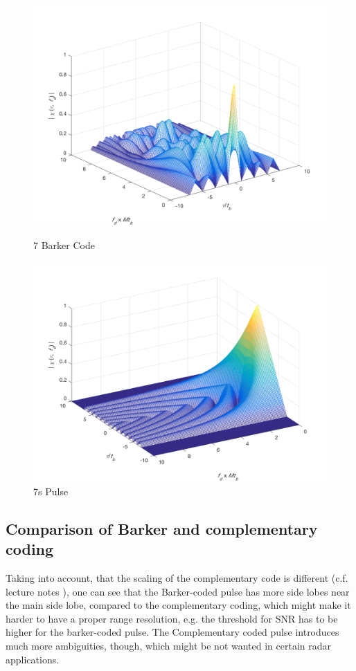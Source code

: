 \begin{figure}[!htbp]
  \centering
  \begin{minipage}[b]{0.45\textwidth}
    \includegraphics[width=\textwidth]{images/barker7_3D}
    \caption{7 Barker Code}
    \label{fig:7barker_3D}
  \end{minipage}
  \hfill
  \begin{minipage}[b]{0.45\textwidth}
    \includegraphics[width=\textwidth]{images/pulse7s_3D}
    \caption{7s Pulse}
    \label{fig:pulse7s_3D}
  \end{minipage}
\end{figure}

\subsection{Comparison of Barker and complementary coding}
Taking into account, that the scaling of the complementary code is different (c.f. lecture notes \citep{enmark:lecture}), one can see that the Barker-coded pulse has more side lobes near the main side lobe, compared to the complementary coding, which might make it harder to have a proper range resolution, e.g. the threshold for SNR has to be higher for the barker-coded pulse.
The Complementary coded pulse introduces much more ambiguities, though, which might be not wanted in certain radar applications.

